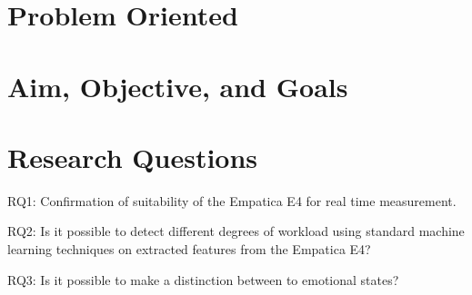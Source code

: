 
\section{Problem Oriented}

\section{Aim, Objective, and Goals}
\section{Research Questions}
RQ1: Confirmation of suitability of the Empatica E4 for real time measurement.

RQ2: Is it possible to detect different degrees of workload using standard machine learning techniques on extracted features from the Empatica E4?

RQ3: Is it possible to make a distinction between to emotional states?

